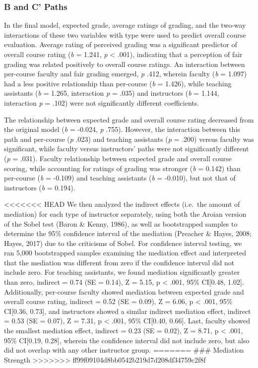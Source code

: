 \documentclass[man]{apa6}
\theoremstyle{definition}
\theoremstyle{definition}
\theoremstyle{definition}
\theoremstyle{remark}
\begin{document}
\subsubsection{B and C' Paths}\label{b-and-c-paths}

In the final model, expected grade, average ratings of grading, and the
two-way interactions of these two variables with type were used to
predict overall course evaluation. Average rating of perceived grading
was a significant predictor of overall course rating (\emph{b} = 1.241,
\emph{p} \textless{} .001), indicating that a perception of fair grading
was related positively to overall course ratings. An interaction between
per-course faculty and fair grading emerged, \emph{p} .412, wherein
faculty (\emph{b} = 1.097) had a less positive relationship than
per-course (\emph{b} = 1.426), while teaching assistants (\emph{b} =
1.265, interaction \emph{p} = .035) and instructors (\emph{b} = 1.144,
interaction \emph{p} = .102) were not significantly different
coefficients.

The relationship between expected grade and overall course rating
decreased from the original model (\emph{b} = -0.024, \emph{p} .755).
However, the interaction between this path and per-course (\emph{p}
.023) and teaching assistants (\emph{p} = .200) versus faculty was
significant, while faculty versus instructors' paths were not
significantly different (\emph{p} = .031). Faculty relationship between
expected grade and overall course scoring, while accounting for ratings
of grading was stronger (\emph{b} = 0.142) than per-course (\emph{b} =
-0.109) and teaching assistants (\emph{b} = -0.010), but not that of
instructors (\emph{b} = 0.194).

\textless{}\textless{}\textless{}\textless{}\textless{}\textless{}\textless{}
HEAD We then analyzed the indirect effects (i.e.~the amount of
mediation) for each type of instructor separately, using both the Aroian
version of the Sobel test (Baron \& Kenny, 1986), as well as
bootstrapped samples to determine the 95\% confidence interval of the
mediation (Preacher \& Hayes, 2008; Hayes, 2017) due to the criticisms
of Sobel. For confidence interval testing, we ran 5,000 bootstrapped
samples examining the mediation effect and interpreted that the
mediation was different from zero if the confidence interval did not
include zero. For teaching assistants, we found mediation significantly
greater than zero, indirect = 0.74 (SE = 0.14), Z = 5.15, p \textless{}
.001, 95\% CI{[}0.48, 1.02{]}. Additionally, per-course faculty showed
mediation between expected grade and overall course rating, indirect =
0.52 (SE = 0.09), Z = 6.06, p \textless{} .001, 95\% CI{[}0.36, 0.73{]},
and instructors showed a similar indirect mediation effect, indirect =
0.53 (SE = 0.07), Z = 7.31, p \textless{} .001, 95\% CI{[}0.40, 0.66{]}.
Last, faculty showed the smallest mediation effect, indirect = 0.23 (SE
= 0.02), Z = 8.71, p \textless{} .001, 95\% CI{[}0.19, 0.28{]}, wherein
the confidence interval did not include zero, but also did not overlap
with any other instructor group. ======= \#\#\# Mediation Strength
\textgreater{}\textgreater{}\textgreater{}\textgreater{}\textgreater{}\textgreater{}\textgreater{}
ff99f09104d8bb0542b219d7d208df34759c2f8f
\end{document}
